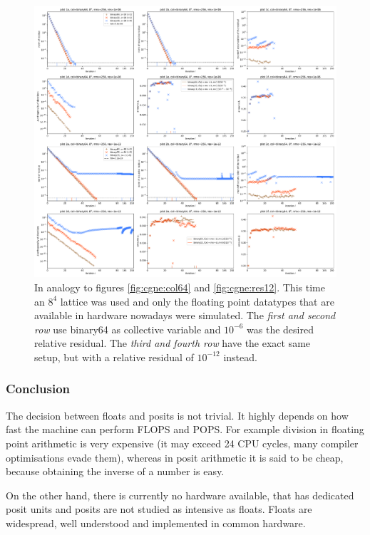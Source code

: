 \documentclass{article}
\theoremstyle{plain} %
\theoremstyle{convention} %
\theoremstyle{remark} %
\numberwithin{equation}{section}
\begin{document}
\begin{figure}[h]
    \centering
    \includegraphics[width=1.0\textwidth]{plots/cgne_8x8x8x8_new}
    \caption{In analogy to figures \ref{fig:cgne:col64} and \ref{fig:cgne:res12}. This time an $8^4$ lattice was used and only the floating point datatypes that are available in hardware nowadays were simulated. The \textit{first and second row} use \gls{binary64} as collective variable and $10^{-6}$ was the desired relative residual. The \textit{third and fourth row} have the exact same setup, but with a relative residual of $10^{-12}$ instead.}
    \label{fig:cgne8}
\end{figure}

\subsubsection{Conclusion}

The decision between floats and posits is not trivial. It highly depends on how fast the machine can perform \acrshort{FLOPS} and \acrshort{POPS}. For example division in floating point arithmetic is very expensive (it may exceed \num{24} CPU cycles, many compiler optimisations evade them), whereas in posit arithmetic it is said to be cheap, because obtaining the inverse of a number is easy.

On the other hand, there is currently no hardware available, that has dedicated posit units and posits are not studied as intensive as floats. Floats are widespread, well understood and implemented in common hardware.
\end{document}
